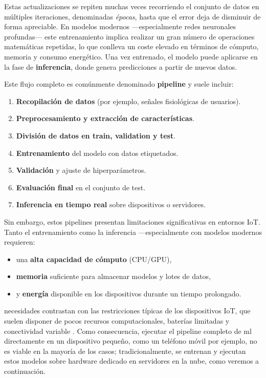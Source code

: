 \documentclass{report}
\begin{document}
Estas actualizaciones se repiten muchas veces recorriendo el conjunto de datos en múltiples iteraciones, denominadas \textit{épocas}, hasta que el error deja de disminuir de forma apreciable. En modelos modernos —especialmente redes neuronales profundas— este entrenamiento implica realizar un gran número de operaciones matemáticas repetidas, lo que conlleva un coste elevado en términos de cómputo, memoria y consumo energético. Una vez entrenado, el modelo puede aplicarse en la fase de \textbf{inferencia}, donde genera predicciones a partir de nuevos datos.


Este flujo completo es comúnmente denominado \textbf{pipeline} y suele incluir:
\begin{enumerate}
    \item \textbf{Recopilación de datos} (por ejemplo, señales fisiológicas de usuarios).
    \item \textbf{Preprocesamiento y extracción de características}.
    \item \textbf{División de datos en train, validation y test}.
    \item \textbf{Entrenamiento} del modelo con datos etiquetados.
    \item \textbf{Validación} y ajuste de hiperparámetros.
    \item \textbf{Evaluación final} en el conjunto de test.
    \item \textbf{Inferencia en tiempo real} sobre dispositivos o servidores.
\end{enumerate}

Sin embargo, estos pipelines presentan limitaciones significativas en entornos IoT. Tanto el entrenamiento como la inferencia —especialmente con modelos modernos requieren:
\begin{itemize}
    \item una \textbf{alta capacidad de cómputo} (CPU/GPU),
    \item \textbf{memoria} suficiente para almacenar modelos y lotes de datos,
    \item y \textbf{energía} disponible en los dispositivos durante un tiempo prolongado.
\end{itemize}

 necesidades contrastan con las restricciones típicas de los dispositivos IoT, que suelen disponer de pocos recursos computacionales, baterías limitadas y conectividad variable \cite{shi2016edge}. Como consecuencia, ejecutar el pipeline completo de \gls{ml} directamente en un dispositivo pequeño, como un teléfono móvil por ejemplo, no es viable en la mayoría de los casos; tradicionalmente, se entrenan y ejecutan estos modelos sobre hardware dedicado en servidores en la nube, como veremos a continuación.
 
\end{document}
